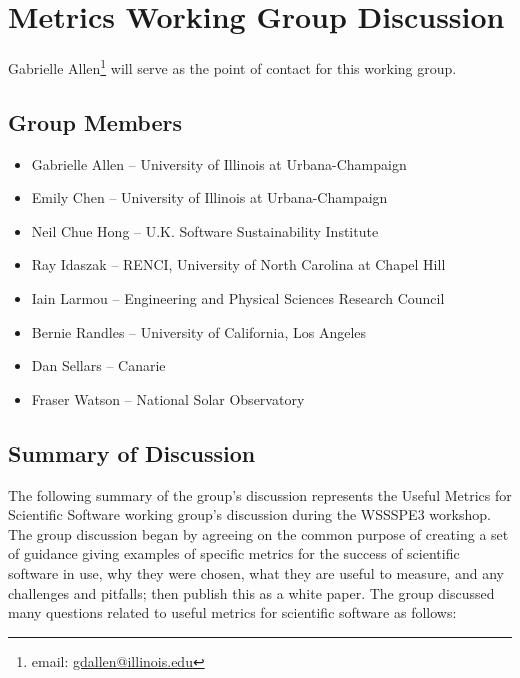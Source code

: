 \section{Metrics Working Group Discussion}
\label{sec:appendix_metrics}

Gabrielle Allen\footnote{email: \href{mailto:gdallen@illinois.edu}{gdallen@illinois.edu}} will serve as the point of contact for this working group.


\subsection{Group Members}

\begin{itemize}
\item Gabrielle Allen -- University of Illinois at Urbana-Champaign
\item Emily Chen -- University of Illinois at Urbana-Champaign
\item Neil Chue Hong -- U.K. Software Sustainability Institute
\item Ray Idaszak -- RENCI, University of North Carolina at Chapel Hill
\item Iain Larmou -- Engineering and Physical Sciences Research Council
\item Bernie Randles -- University of California, Los Angeles
\item Dan Sellars -- Canarie
\item Fraser Watson -- National Solar Observatory
\end{itemize}

\subsection{Summary of Discussion}

The following summary of the group's discussion represents the Useful Metrics for Scientific Software working group's discussion during 
the WSSSPE3 workshop. The group discussion began by agreeing on the common purpose of creating a set of guidance giving examples 
of specific metrics for the success of scientific software in use, why they were chosen, what they are useful to measure, and 
any challenges and pitfalls; then publish this as a white paper.  The group discussed many questions related to useful metrics for scientific software as follows: 

